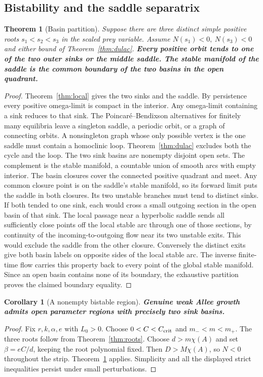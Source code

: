 \documentclass[12pt,a4paper,twoside,fleqn]{article}
\theoremstyle{journal}
\newtheorem{theorem}{Theorem}
\newtheorem{corollary}{Corollary}
\newcommand{\claim}[1]{{\normalfont\bfseries\boldmath #1}}
\begin{document}
\subsection{Bistability and the saddle separatrix}
\begin{theorem}[Basin partition]\label{thm:basin}
Suppose there are three distinct simple positive roots \(s_1<s_2<s_3\) in the scaled prey variable. Assume \(N(s_1)<0,\ N(s_3)<0\) and either bound of Theorem~\ref{thm:dulac}.
\claim{Every positive orbit tends to one of the two outer sinks or the middle saddle. The stable manifold of the saddle is the common boundary of the two basins in the open quadrant.}
\end{theorem}
\begin{proof}
Theorem~\ref{thm:local} gives the two sinks and the saddle. By persistence every positive omega-limit is compact in the interior. Any omega-limit containing a sink reduces to that sink. The Poincar\'e--Bendixson alternatives for finitely many equilibria leave a singleton saddle, a periodic orbit, or a graph of connecting orbits. A nonsingleton graph whose only possible vertex is the one saddle must contain a homoclinic loop. Theorem~\ref{thm:dulac} excludes both the cycle and the loop.
The two sink basins are nonempty disjoint open sets. The complement is the stable manifold, a countable union of smooth arcs with empty interior. The basin closures cover the connected positive quadrant and meet. Any common closure point is on the saddle's stable manifold, so its forward limit puts the saddle in both closures. Its two unstable branches must tend to distinct sinks. If both tended to one sink, each would cross a small outgoing section in the open basin of that sink. The local passage near a hyperbolic saddle sends all sufficiently close points off the local stable arc through one of those sections, by continuity of the incoming-to-outgoing flow near its two unstable exits. This would exclude the saddle from the other closure. Conversely the distinct exits give both basin labels on opposite sides of the local stable arc. The inverse finite-time flow carries this property back to every point of the global stable manifold. Since an open basin contains none of its boundary, the exhaustive partition proves the claimed boundary equality.
\end{proof}


\begin{corollary}[A nonempty bistable region]
\claim{Genuine weak Allee growth admits open parameter regions with precisely two sink basins.}
\end{corollary}
\begin{proof}
Fix \(r,k,\alpha,e\) with \(L_0>0\). Choose \(0<C<C_{\rm crit}\) and \(m_-<m<m_+\). The three roots follow from Theorem~\ref{thm:roots}. Choose \(d>m\chi(A)\) and set \(\beta=eC/d\), keeping the root polynomial fixed. Then \(D>M\chi(A)\), so \(N<0\) throughout the strip. Theorem~\ref{thm:basin} applies. Simplicity and all the displayed strict inequalities persist under small perturbations.
\end{proof}
\end{document}
